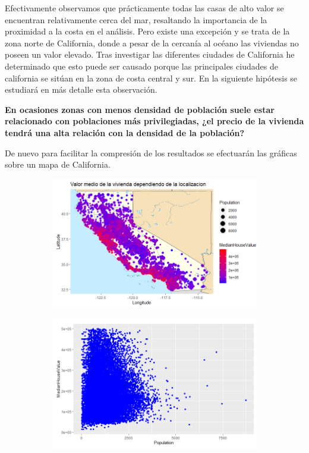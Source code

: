 Efectivamente observamos que prácticamente todas las casas de alto valor se encuentran relativamente cerca del mar, resaltando la importancia de la proximidad a la costa en el análisis. 
Pero existe una excepción y se trata de la zona norte de California, donde a pesar de la cercanía al océano las viviendas no poseen un valor elevado. Tras investigar las diferentes ciudades de California he determinado que esto puede ser causado porque las principales ciudades de california se sitúan en la zona de costa central y sur. En la siguiente hipótesis se estudiará en más detalle esta observación.



\vspace{1cm}
\textbf{En ocasiones zonas con menos densidad de población suele estar relacionado con poblaciones más privilegiadas, ¿el precio de la vivienda tendrá una alta relación con la densidad de la población?}

De nuevo para facilitar la compresión de los resultados se efectuarán las gráficas sobre un mapa de California.


\begin{figure}[!tbh]
	\centering
	\begin{subfigure}{0.5\textwidth}
		\includegraphics[width=1\linewidth]{figures/hipo_3}
		\caption{}
		\label{fig:hipo3}
	\end{subfigure}\hfil %
	\begin{subfigure}{0.5\textwidth}
		\includegraphics[width=1\linewidth]{figures/hipo_4}
		\caption{}
		\label{fig:hipo4}
	\end{subfigure}\hfil %
\end{figure}

